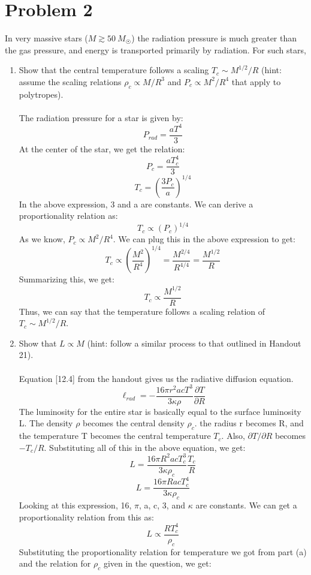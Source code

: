 \documentclass[10pt]{article}
\begin{document}
\section*{Problem 2}
In very massive stars ($M \gtrsim 50 \ M_{\astrosun}$) the radiation pressure is much greater than the gas pressure, and energy is transported primarily by radiation. For such stars,
\begin{enumerate}[label=(\alph*)]
    \item Show that the central temperature follows a scaling $T_{c} \sim M^{1/2} / R$ (hint: assume the scaling relations $\rho_{c} \propto M / R^{3}$ and $P_{c} \propto M^{2}/R^{4}$ that apply to polytropes).\\ \\
    The radiation pressure for a star is given by:
    \[ P_{rad} = \frac{a T^4}{3}\]
    At the center of the star, we get the relation:
    \[ P_{c} = \frac{a T_{c}^4}{3}\]
    \[ T_{c} = \left( \frac{3P_{c}}{a}\right)^{1/4}\]
    In the above expression, 3 and a are constants. We can derive a proportionality relation as:
    \[ T_{c} \propto (P_{c})^{1/4}\]
    As we know, $P_{c} \propto M^2/R^4$. We can plug this in the above expression to get:
    \[ T_{c} \propto \left( \frac{M^2}{R^4}\right)^{1/4} = \frac{M^{2/4}}{R^{4/4}} = \frac{M^{1/2}}{R}\]
    Summarizing this, we get:
    \[ T_{c} \propto \frac{M^{1/2}}{R}\]
    Thus, we can say that the temperature follows a scaling relation of $T_{c} \sim M^{1/2}/R$. \\
    \item Show that $L \propto M$ (hint: follow a similar process to that outlined in Handout 21).\\ \\
    Equation [12.4] from the handout gives us the radiative diffusion equation.
    \[ \ell_{rad} = - \frac{16 \pi r^2 a c T^3}{3 \kappa \rho} \frac{\partial T}{\partial R}\]
    The luminosity for the entire star is basically equal to the surface luminosity L. The density $\rho$ becomes the central density $\rho_{c}$. the radius r becomes R, and the temperature T becomes the central temperature $T_{c}$. Also, $\partial T / \partial R$ becomes $-T_{c}/R$. Substituting all of this in the above equation, we get:
    \[ L = \frac{16 \pi R^2 a c T_{c}^3}{3 \kappa \rho_{c}} \frac{T_{c}}{R}\]
    \[ L = \frac{16 \pi R a c T_{c}^4}{3 \kappa \rho_{c}}\]
    Looking at this expression, 16, $\pi$, a, c, 3, and $\kappa$ are constants. We can get a proportionality relation from this as:
    \[ L \propto \frac{R T_{c}^4}{ \rho_{c}}\]
    Substituting the proportionality relation for temperature we got from part (a) and the relation for $\rho_{c}$ given in the question, we get:

\end{enumerate}
\end{document}
